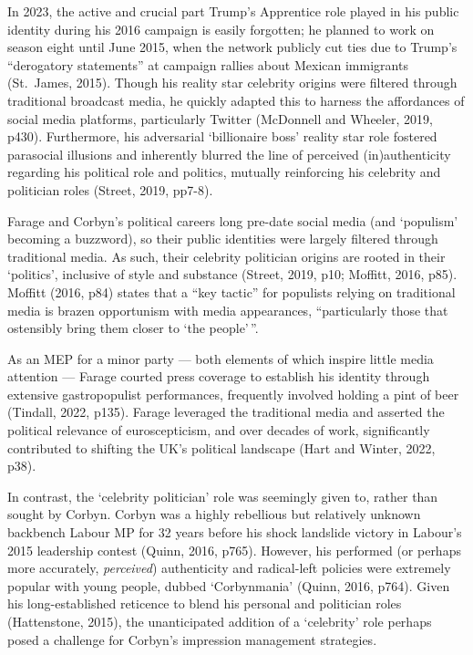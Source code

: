 \documentclass[a4paper, nobind]{templates/ociamthesis}
\begin{document}
In 2023, the active and crucial part Trump's Apprentice role played in his public identity during his 2016 campaign is easily forgotten; he planned to work on season eight until June 2015, when the network publicly cut ties due to Trump's ``derogatory statements'' at campaign rallies about Mexican immigrants (St.~James, 2015). Though his reality star celebrity origins were filtered through traditional broadcast media, he quickly adapted this to harness the affordances of social media platforms, particularly Twitter (McDonnell and Wheeler, 2019, p430). Furthermore, his adversarial `billionaire boss' reality star role fostered parasocial illusions and inherently blurred the line of perceived (in)authenticity regarding his political role and politics, mutually reinforcing his celebrity and politician roles (Street, 2019, pp7-8).

Farage and Corbyn's political careers long pre-date social media (and `populism' becoming a buzzword), so their public identities were largely filtered through traditional media. As such, their celebrity politician origins are rooted in their `politics', inclusive of style and substance (Street, 2019, p10; Moffitt, 2016, p85). Moffitt (2016, p84) states that a ``key tactic'' for populists relying on traditional media is brazen opportunism with media appearances, ``particularly those that ostensibly bring them closer to `the people'\,''.

As an MEP for a minor party --- both elements of which inspire little media attention --- Farage courted press coverage to establish his identity through extensive gastropopulist performances, frequently involved holding a pint of beer (Tindall, 2022, p135). Farage leveraged the traditional media and asserted the political relevance of euroscepticism, and over decades of work, significantly contributed to shifting the UK's political landscape (Hart and Winter, 2022, p38).

In contrast, the `celebrity politician' role was seemingly given to, rather than sought by Corbyn. Corbyn was a highly rebellious but relatively unknown backbench Labour MP for 32 years before his shock landslide victory in Labour's 2015 leadership contest (Quinn, 2016, p765). However, his performed (or perhaps more accurately, \emph{perceived}) authenticity and radical-left policies were extremely popular with young people, dubbed `Corbynmania' (Quinn, 2016, p764). Given his long-established reticence to blend his personal and politician roles (Hattenstone, 2015), the unanticipated addition of a `celebrity' role perhaps posed a challenge for Corbyn's impression management strategies.
\end{document}
